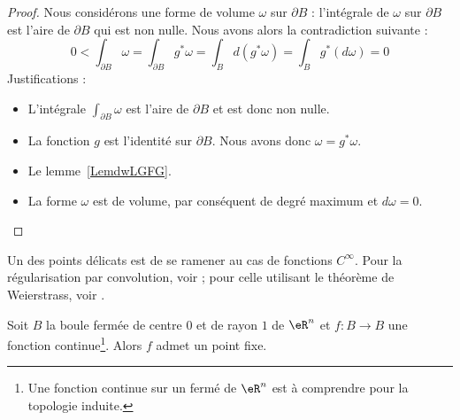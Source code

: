 \begin{proof}
    Nous considérons une forme de volume \( \omega\) sur \( \partial B\) : l'intégrale de \( \omega\) sur \( \partial B\) est l'aire de \( \partial B\) qui est non nulle. Nous avons alors la contradiction suivante : 
    \begin{equation}
        0<\int_{\partial B}\omega
        =\int_{\partial B}g^*\omega
        =\int_Bd(g^*\omega)
        =\int_Bg^*(d\omega)
        =0
    \end{equation}
    Justifications :
    \begin{itemize}
        \item
            L'intégrale \( \int_{\partial B}\omega\) est l'aire de \( \partial B\) et est donc non nulle.       %
        \item
            La fonction \( g\) est l'identité sur \( \partial B\). Nous avons donc \( \omega=g^*\omega\).
        \item
            Le lemme~\ref{LemdwLGFG}.
        \item
            La forme \( \omega\) est de volume, par conséquent de degré maximum et \( d\omega=0\).      %
    \end{itemize}
\end{proof}

Un des points délicats est de se ramener au cas de fonctions \( C^{\infty}\). Pour la régularisation par convolution, voir \cite{AllardBrouwer}; pour celle utilisant le théorème de Weierstrass, voir \cite{KuttlerTopInAl}.
\begin{theorem}\label{ThoRGjGdO}
    Soit \( B\) la boule fermée de centre \( 0\) et de rayon \( 1\) de \( \eR^n\) et \( f\colon B\to B\) une fonction continue\footnote{Une fonction continue sur un fermé de \( \eR^n\) est à comprendre pour la topologie induite.}. Alors \( f\) admet un point fixe.
\end{theorem}

